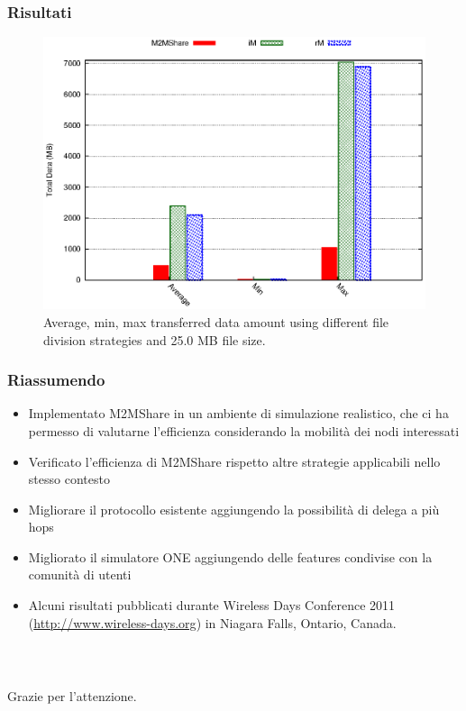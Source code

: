 \documentclass{beamer}
\begin{document}
\begin{frame}
\frametitle{Risultati}
\begin{center}
\begin{figure}[ht]
\includegraphics[scale=0.7]{../grafici/dataDFS_25MB.eps}
\caption{Average, min, max transferred data amount using different file division strategies and 25.0 MB file size.}
\end{figure}
\end{center}
\end{frame}

\begin{frame}
\frametitle{Riassumendo}

\begin{itemize}
\item Implementato M2MShare in un ambiente di simulazione realistico, che ci ha permesso di valutarne l'efficienza considerando la mobilità dei nodi interessati
\pause
\item Verificato l'efficienza di M2MShare rispetto altre strategie applicabili nello stesso contesto
\pause
\item Migliorare il protocollo esistente aggiungendo la possibilità di delega a più hops
\pause
\item Migliorato il simulatore ONE aggiungendo delle features condivise con la comunità di utenti
\pause
\item Alcuni risultati pubblicati durante Wireless Days Conference 2011 (\href{http://www.wireless-days.org/}{http://www.wireless-days.org}) in Niagara Falls, Ontario, Canada.
\end{itemize}
\end{frame}

\begin{frame}
\frametitle{\ }
\begin{center}
Grazie per l'attenzione.
\end{center}
\end{frame}
\end{document}
